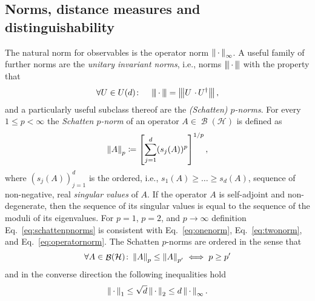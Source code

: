 \documentclass[a4paper,12pt,listof=totoc,index=totoc,bibliography=totoc,headsepline=false,headings=normal,BCOR16.153846mm,DIV12,headinclude,twoside,cleardoublepage=empty,numbers=noenddot,final]{scrreprt}
\theoremstyle{mystyle}
\numberwithin{equation}{section}
\numberwithin{figure}{section}
\numberwithin{lemma}{section}
\numberwithin{theorem}{section}
\numberwithin{corollary}{section}
\numberwithin{definition}{section}
\numberwithin{conjecture}{section}
\numberwithin{observation}{section}
\newcommand{\+}{\mkern2mu}
\newcommand{\coloneqq}{\mathrel{\vcentcolon\mkern-1.2mu=}} %
\newcommand{\texteqref}[1]{Eq.~\eqref{#1}}
\newcommand{\argdot}{{\,\cdot\,}}
\newcommand{\itholds}{\colon\mathchoice{\quad}{}{}{}}
\newcommand{\norm}[2][]{
  \ifthenelse{\equal{#1}{}}
    {\left\| {#2} \right\|}
    {\ifthenelse{\equal{#1}{uinv}}
      {\left\vert\kern-0.25ex\left\vert\kern-0.25ex\left\vert {#2} \right\vert\kern-0.25ex\right\vert\kern-0.25ex\right\vert}
      {\left\| {#2} \right\|_{#1}}
    }
}
\newcommand{\ad}{^\dagger}
\DeclareMathOperator{\1}{\mathds{1}}
\DeclareMathOperator{\Bop}{\mathcal{B}}
\newcommand{\mc}[1]{\mathcal{#1}}
\newcommand{\mcH}{\mc{H}}
\begin{document}
\subsection{Norms, distance measures and distinguishability}
\label{sec:normsanddistancemeasures}
%
The natural norm for observables is the operator norm $\norm[\infty]\argdot$.
A useful family of further norms are the \emph{unitary invariant norms}, i.e., norms $\norm[uinv]\argdot$ with the property that
\begin{equation}
  \forall U \in U(d)\itholds \norm[uinv]{\argdot} = \norm[uinv]{U\,\argdot U\ad} ,
\end{equation}
and a particularly useful subclass thereof are the \emph{(Schatten) $p$-norms}.
For every $1\leq p<\infty$ the \emph{Schatten $p$-norm} of an operator $A \in \Bop(\mcH)$ is defined as \cite{bhatia}
\begin{equation} \label{eq:schattenpnorms}
  \norm[p]A \coloneqq \left[\sum_{j=1}^d (s_j(A))^p \right]^{1/p} ,
\end{equation}
where $(s_j(A))_{j=1}^d$ is the ordered, i.e., $s_1(A) \geq \dots \geq s_d(A)$, sequence of non-negative, real \emph{singular values} of $A$.
If the operator $A$ is self-adjoint and non-degenerate, then the sequence of its singular values is equal to the sequence of the moduli of its eigenvalues.
For $p=1$, $p=2$, and $p\to\infty$ definition \texteqref{eq:schattenpnorms} is consistent with \texteqref{eq:onenorm}, \texteqref{eq:twonorm}, and \texteqref{eq:operatornorm}.
The Schatten $p$-norms are ordered in the sense that \cite{bhatia}
\begin{equation}
  \forall A\in\Bop(\mcH)\colon \norm[p]A \leq \norm[p']A \iff p\geq p'
\end{equation}
and in the converse direction the following inequalities hold \cite{bhatia}
\begin{equation}
  \norm[1]\argdot \leq \sqrt{d} \norm[2]\argdot \leq d \norm[\infty]\argdot .
\end{equation}
\end{document}
